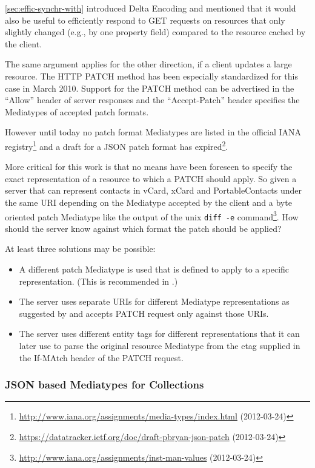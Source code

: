 \documentclass[12pt,a4paper,twoside]{scrartcl}		%
\newcommand{\citeurl}[2]{\url{#1} (#2)}
\begin{document}
\autoref{sec:effic-synchr-with} introduced Delta Encoding\cite{RFC3229} and
mentioned that it would also be useful to efficiently respond to GET requests on
resources that only slightly changed (e.g., by one property field) compared to
the resource cached by the client.

The same argument applies for the other direction, if a client updates a large
resource. The HTTP PATCH method\cite{RFC5789} has been especially standardized
for this case in March 2010. Support for the PATCH method can be advertised in
the ``Allow'' header of server responses and the ``Accept-Patch'' header
specifies the Mediatypes of accepted patch formats.

However until today no patch format Mediatypes are listed in the official IANA
registry\footnote{\citeurl{http://www.iana.org/assignments/media-types/index.html}{2012-03-24}}
and a draft for a JSON patch format has
expired\footnote{\citeurl{https://datatracker.ietf.org/doc/draft-pbryan-json-patch}{2012-03-24}}.

More critical for this work is that no means have been foreseen to specify the
exact representation of a resource to which a PATCH should apply. So given a
server that can represent contacts in vCard, xCard and PortableContacts under
the same URI depending on the Mediatype accepted by the client and a byte
oriented patch Mediatype like the output of the unix \lstinline:diff -e:
command\footnote{\citeurl{http://www.iana.org/assignments/inst-man-values}{2012-03-24}}. How
should the server know against which format the patch should be applied?

At least three solutions may be possible:
\begin{itemize}
\item A different patch Mediatype is used that is defined to apply to a specific
  representation. (This is recommended in \cite[ch. 11.9]{Allamaraju_2010}.)
\item The server uses separate URIs for different Mediatype representations as
  suggested by \cite{Raman2006} and accepts PATCH request only against those
  URIs.
\item The server uses different entity tags for different representations that it can later use to parse the original resource Mediatype from the etag supplied in the If-MAtch header of the PATCH request.
\end{itemize}

\subsubsection{JSON based Mediatypes for Collections}
\label{sec:media-types-coll}
\end{document}
